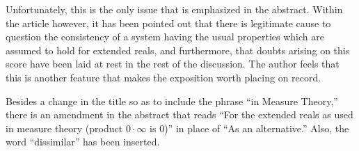 \documentclass[11pt]{article}
\begin{document}
Unfortunately, this is the only issue that is emphasized in the
abstract. Within the article however, it has been pointed out that
there is legitimate cause to question the consistency of a system
having the usual properties which are assumed to hold for extended
reals, and furthermore, that doubts arising on this score have
been laid at rest in the rest of the discussion. The author feels
that this is another feature that makes the exposition worth
placing on record.\

\vspace{4mm} Besides a change in the title so as to include the
phrase ``in Measure Theory,'' there is an amendment in the abstract
that reads ``For the extended reals as used in measure theory
(product $0\cdot\infty$ is 0)'' in place of ``As an alternative.''
Also, the word ``dissimilar'' has been inserted.
\end{document}

